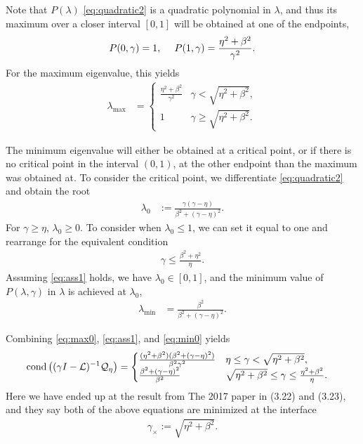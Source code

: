 \documentclass[a4paper,10pt]{article}
\begin{document}
Note that $P(\lambda)$ \eqref{eq:quadratic2} is a quadratic polynomial in $\lambda$,
and thus its maximum over a closer interval $[0,1]$ will be obtained at one of the
endpoints,
%
\begin{align*}
P(0,\gamma) = 1, \hspace{3ex} P(1,\gamma) = \frac{\eta^2+\beta^2}{\gamma^2}.
\end{align*}
%
For the maximum eigenvalue, this yields
%
\begin{align}\label{eq:max0}
\lambda_{\max} & = \begin{cases} 
	\frac{\eta^2+\beta^2}{\gamma^2} & \gamma < \sqrt{\eta^2+\beta^2}, \\
	1 & \gamma \geq \sqrt{\eta^2+\beta^2}.
	\end{cases}
\end{align}
%

The minimum eigenvalue will either be obtained at a critical point, or if there is
no critical point in the interval $(0,1)$, at the other endpoint than the maximum
was obtained at. To consider the critical point, we differentiate \eqref{eq:quadratic2}
and obtain the root
%
\begin{align}\label{eq:lambda_0}
\lambda_0 &:= \frac{\gamma(\gamma-\eta)}{\beta^2+(\gamma-\eta)^2}.
\end{align}
%
For $\gamma \geq \eta$, $\lambda_0 \geq 0$. To consider when $\lambda_0\leq 1$, we can
set it equal to one and rearrange for the equivalent condition
%
\begin{align}\label{eq:ass1}
\gamma \leq \frac{\beta^2+\eta^2}{\eta}.
\end{align}
%
Assuming \eqref{eq:ass1} holds, we have $\lambda_0 \in[0,1]$, and
the minimum value of $P(\lambda,\gamma)$ in $\lambda$ is achieved at $\lambda_0$,
%
\begin{align}\label{eq:min0}
\lambda_{\min} & = \frac{\beta^2}{\beta^2 + (\gamma-\eta)^2}.
\end{align}
%

Combining \eqref{eq:max0}, \eqref{eq:ass1}, and \eqref{eq:min0} yields
%
\begin{align}\label{eq:cases0}
\textnormal{cond}\left((\gamma I- {\mathcal{L}})^{-1}\mathcal{Q}_\eta\right) & =
\begin{cases} 
	\frac{(\eta^2+\beta^2)(\beta^2 + (\gamma-\eta)^2)}
		{\beta^2\gamma^2}
		& \eta \leq \gamma < \sqrt{\eta^2+\beta^2}, \\
	\frac{\beta^2 + (\gamma-\eta)^2}{\beta^2}
		& \sqrt{\eta^2+\beta^2} \leq \gamma \leq \frac{\eta^2+\beta^2}{\eta}.
	\end{cases}
\end{align}
%
Here we have ended up at the result from The 2017 paper in (3.22) and (3.23),
and they say both of the above equations are minimized at the interface
%
\begin{align}\label{eq:gamma_opt0}
\gamma_\times := \sqrt{\eta^2+\beta^2}.
\end{align}
%
\end{document}
